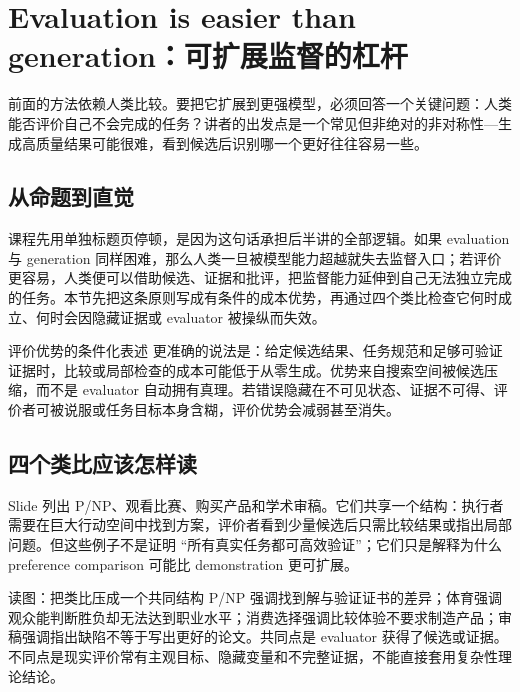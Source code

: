 \section{Evaluation is easier than generation：可扩展监督的杠杆}

前面的方法依赖人类比较。要把它扩展到更强模型，必须回答一个关键问题：人类能否评价自己不会完成的任务？讲者的出发点是一个常见但非绝对的非对称性---生成高质量结果可能很难，看到候选后识别哪一个更好往往容易一些。

\subsection{从命题到直觉}

课程先用单独标题页停顿，是因为这句话承担后半讲的全部逻辑。如果 evaluation 与 generation 同样困难，那么人类一旦被模型能力超越就失去监督入口；若评价更容易，人类便可以借助候选、证据和批评，把监督能力延伸到自己无法独立完成的任务。本节先把这条原则写成有条件的成本优势，再通过四个类比检查它何时成立、何时会因隐藏证据或 evaluator 被操纵而失效。


\begin{importantbox}{评价优势的条件化表述}
更准确的说法是：给定候选结果、任务规范和足够可验证证据时，比较或局部检查的成本可能低于从零生成。优势来自搜索空间被候选压缩，而不是 evaluator 自动拥有真理。若错误隐藏在不可见状态、证据不可得、评价者可被说服或任务目标本身含糊，评价优势会减弱甚至消失。
\end{importantbox}

\subsection{四个类比应该怎样读}

Slide 列出 P/NP、观看比赛、购买产品和学术审稿。它们共享一个结构：执行者需要在巨大行动空间中找到方案，评价者看到少量候选后只需比较结果或指出局部问题。但这些例子不是证明 ``所有真实任务都可高效验证''；它们只是解释为什么 preference comparison 可能比 demonstration 更可扩展。


\begin{knowledgebox}{读图：把类比压成一个共同结构}
P/NP 强调找到解与验证证书的差异；体育强调观众能判断胜负却无法达到职业水平；消费选择强调比较体验不要求制造产品；审稿强调指出缺陷不等于写出更好的论文。共同点是 evaluator 获得了候选或证据。不同点是现实评价常有主观目标、隐藏变量和不完整证据，不能直接套用复杂性理论结论。
\end{knowledgebox}

